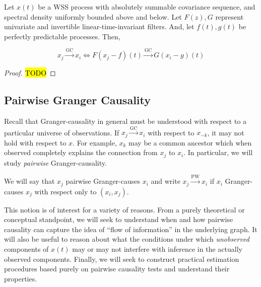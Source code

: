 \documentclass[12pt]{article}
\def\gc{\overset{\text{GC}}{\rightarrow}}  %
\def\pwgc{\overset{\text{PW}}{\rightarrow}}  %
\def\te{\overset{\mathcal{T}}{\rightarrow}}  %
\begin{document}

\begin{proposition}
  Let $x(t)$ be a WSS process with absolutely summable covariance
  sequence, and spectral density uniformly bounded above and below.  Let
  $F(z), G$ represent univariate and invertible
  linear-time-invariant filters.  And, let $f(t), g(t)$ be perfectly
  predictable processes.  Then,

  \begin{equation}
    x_j \gc x_i \iff F(x_j - f)(t) \gc G(x_i - g)(t)
  \end{equation}

\begin{proof}
  \hl{TODO}
\end{proof}
\end{proposition}

\subsection{Pairwise Granger Causality}
\label{sec:pwgc}
Recall that Granger-causality in general must be understood with
respect to a particular universe of observations.  If $x_j \gc x_i$
with respect to $x_{-k}$, it may not hold with respect to $x$.  For
example, $x_k$ may be a common ancestor which when observed completely
explains the connection from $x_j$ to $x_i$.  In particular, we will
study \textit{pairwise} Granger-causality.

\begin{definition}
  We will say that $x_j$ pairwise Granger-causes $x_i$ and write
  $x_j \pwgc x_i$ if $x_i$ Granger-causes $x_j$ with respect only to
  $(x_i, x_j)$.
\end{definition}

This notion is of interest for a variety of reasons.  From a purely
theoretical or conceptual standpoint, we will seek to understand when
and how pairwise causality can capture the idea of ``flow of
information'' in the underlying graph.  It will also be useful to
reason about what the conditions under which \textit{unobserved}
components of $x(t)$ may or may not interfere with inference in the
actually observed components.  Finally, we will seek to construct
practical estimation procedures based purely on pairwise causality
tests and understand their properties.
\end{document}

